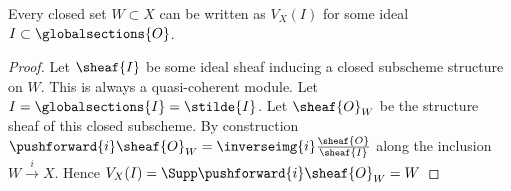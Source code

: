 \begin{lemma}
Every closed set $W \subset X$ can be written as $V_X(I)$ for some ideal $I \subset \globalsections{O}$.
\end{lemma}
\begin{proof}
Let $\sheaf{I}$ be some ideal sheaf inducing a closed subscheme structure on $W$.
This is always a quasi-coherent module.
Let $I = \globalsections{I} = \stilde{I}$.
Let $\sheaf{O}_W$ be the structure sheaf of this closed subscheme. 
By construction $\pushforward{i}\sheaf{O}_W  = {\inverseimg{i}}\frac{\sheaf{O}}{\sheaf{I}}$ 
along the inclusion $W\xrightarrow{i} X$.
Hence $V_X(I) = \Supp\pushforward{i}\sheaf{O}_W = W $
\end{proof}

